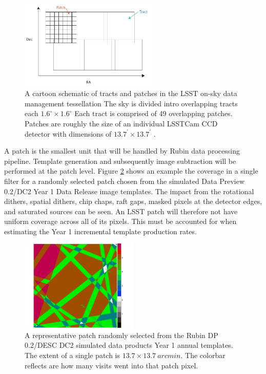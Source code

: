 \documentclass[preprint,linenumbers]{aastex631}
\begin{document}
	\begin{figure}
		\centering
		\includegraphics[width=0.6\textwidth]{results/tracts_and_patches.pdf} 
		
		\caption{A cartoon schematic of tracts and patches in the LSST on-sky data management tessellation The sky is divided intro overlapping tracts each $1.6^{\circ} \times 1.6^{\circ}$ Each tract is comprised of 49 overlapping patches. Patches are roughly the size of an individual LSSTCam CCD detector with dimensions of $13.7^{\prime} \times 13.7^{\prime}$ . }
		
		\label{fig:tractsandpatches}
	\end{figure}
	
	A patch is the smallest unit that will be handled by Rubin data processing pipeline. Template generation and subsequently image subtraction will be performed at the patch level. Figure \ref{fig:randompatch} shows an example the coverage in a single filter for a randomly selected patch chosen from the simulated Data Preview 0.2/DC2 \citep{2021ApJS..253...31L}  Year 1 Data Release image templates. The impact from the rotational dithers, spatial dithers, chip chaps, raft gaps, masked pixels at the detector edges, and saturated sources can be seen. An LSST patch will therefore not have uniform coverage across all of its pixels. This must be accounted for when estimating the Year 1 incremental template production rates. 
	
	\begin{figure}
		\centering
		\includegraphics[width=0.5\textwidth]{results/dc2-random_single_patch_year1_coadd_depth.pdf} 
		
		\caption{A representative patch randomly selected from the Rubin DP 0.2/DESC DC2  \citep{2021ApJS..253...31L} simulated data products Year 1 annual templates. 
			The extent of a single patch is $13.7 \times 13.7\ \si{arcmin}$.
			The colorbar reflects are how many visits went into that patch pixel.}
		
		\label{fig:randompatch}
	\end{figure}
	
\end{document}

